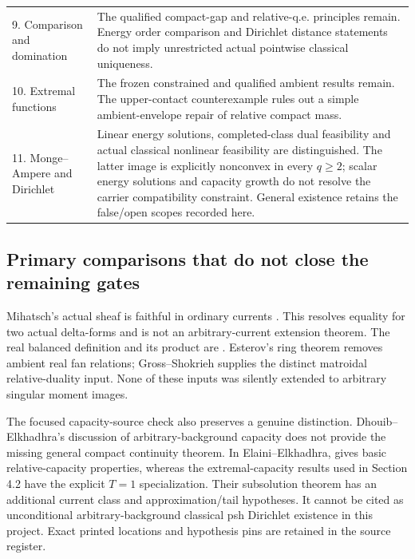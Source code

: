 \documentclass[11pt,a4paper]{article}
\numberwithin{equation}{section}
\theoremstyle{definition}
\theoremstyle{remark}
\begin{document}
\begin{longtable}{@{}p{}p{}@{}}
9. Comparison and domination & The qualified compact-gap and
relative-q.e. principles remain. Energy order comparison and
Dirichlet distance statements do not imply unrestricted actual
pointwise classical uniqueness.\\
10. Extremal functions & The frozen constrained and qualified
ambient results remain. The upper-contact counterexample rules
out a simple ambient-envelope repair of relative compact mass.\\
11. Monge--Ampere and Dirichlet & Linear energy solutions, completed-class dual feasibility and actual
classical nonlinear feasibility are distinguished. The latter image
is explicitly nonconvex in every $q\ge2$; scalar energy solutions and
capacity growth do not resolve the carrier compatibility constraint.
General existence retains the false/open scopes recorded here.\\
\bottomrule
\end{longtable}

\subsection{Primary comparisons that do not close the remaining gates}

Mihatsch's actual sheaf is faithful in ordinary currents
\cite[Proposition 4.11]{Mih24}. This resolves equality for two
actual delta-forms and is not an arbitrary-current extension theorem.
The real balanced definition and its product are
\cite[Theorem 3.3 and Theorem 4.1]{Mih23}. Esterov's ring theorem
\cite[Theorem 3.1]{Est12} removes ambient real fan relations;
Gross--Shokrieh \cite[Lemma 4.4 and Theorem 4.5]{GS21} supplies
the distinct matroidal relative-duality input. None of these inputs
was silently extended to arbitrary singular moment images.

The focused capacity-source check also preserves a genuine
distinction. Dhouib--Elkhadhra's discussion of arbitrary-background
capacity \cite[Section 3]{DE15} does not provide the missing general
compact continuity theorem. In Elaini--Elkhadhra,
\cite[Proposition 3]{EE21} gives basic relative-capacity properties,
whereas the extremal-capacity results used in Section 4.2 have the
explicit $T=1$ specialization. Their subsolution theorem has an
additional current class and approximation/tail hypotheses. It
cannot be cited as unconditional arbitrary-background classical
psh Dirichlet existence in this project. Exact printed locations
and hypothesis pins are retained in the source register.
\end{document}

